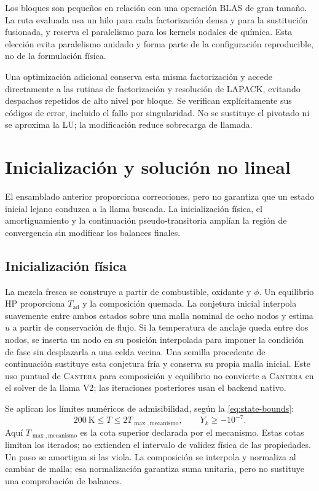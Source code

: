 \documentclass[12pt,a4paper,twoside,openany]{book}
\newcommand{\Tad}{T_{\mathrm{ad}}}
\newcommand{\Vdos}{\textsc{V2}\xspace}
\newcommand{\Cantera}{\textsc{Cantera}\xspace}
\begin{document}
Los bloques son pequeños en relación con una operación BLAS de gran tamaño. La
ruta evaluada usa un hilo para cada factorización densa y para la sustitución
fusionada, y reserva el paralelismo para los kernels nodales de química. Esta
elección evita paralelismo anidado y forma parte de la configuración
reproducible, no de la formulación física.

Una optimización adicional conserva esta misma factorización y accede
directamente a las rutinas de factorización y resolución de LAPACK, evitando
despachos repetidos de alto nivel por bloque. Se verifican explícitamente sus
códigos de error, incluido el fallo por singularidad. No se sustituye el
pivotado ni se aproxima la LU; la modificación reduce sobrecarga de llamada.

\section{Inicialización y solución no lineal}
\label{sec:nonlinear-method}

El ensamblado anterior proporciona correcciones, pero no garantiza que un estado
inicial lejano conduzca a la llama buscada. La inicialización física, el
amortiguamiento y la continuación pseudo-transitoria amplían la región de
convergencia sin modificar los balances finales.

\subsection{Inicialización física}

La mezcla fresca se construye a partir de combustible, oxidante y \(\phi\). Un
equilibrio HP proporciona \(\Tad\) y la composición quemada. La conjetura inicial
interpola suavemente entre ambos estados sobre una malla nominal de ocho nodos
y estima \(u\) a partir de conservación de flujo. Si la temperatura de anclaje
queda entre dos nodos, se inserta un nodo en su posición interpolada para
imponer la condición de fase sin desplazarla a una celda vecina. Una semilla
procedente de continuación sustituye esta conjetura fría y conserva su propia
malla inicial. Este uso puntual de \Cantera para composición y equilibrio no
convierte a \Cantera en el solver de la llama \Vdos; las iteraciones posteriores
usan el backend nativo.

Se aplican los límites numéricos de admisibilidad, según la \cref{eq:state-bounds}:
\begin{equation}
  200\ \mathrm{K}\le T\le 2T_{\max,\mathrm{mecanismo}},
  \qquad Y_k\ge -10^{-7}.
  \label{eq:state-bounds}
\end{equation}
Aquí \(T_{\max,\mathrm{mecanismo}}\) es la cota superior declarada por el
mecanismo. Estas cotas limitan los iterados; no extienden el intervalo de
validez física de las propiedades. Un paso se amortigua si las viola.
La composición se interpola y normaliza al cambiar de malla; esa normalización
garantiza suma unitaria, pero no sustituye una comprobación de balances.
\end{document}
